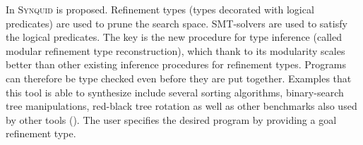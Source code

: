 
In \cite{DBLP:journals/corr/PolikarpovaS15} \textsc{Synquid} is proposed.
Refinement types (types decorated with logical predicates) are used to prune the search space. SMT-solvers are used to satisfy the logical predicates. The key is the new procedure for type inference (called modular refinement type reconstruction), which thank to its modularity scales better than other existing inference procedures for refinement types. Programs can therefore be type checked even before they are put together.
Examples that this tool is able to synthesize include several sorting algorithms,
binary-search tree manipulations, red-black tree rotation as well as other benchmarks also used by other tools ().
The user specifies the desired program by providing a goal refinement type.

